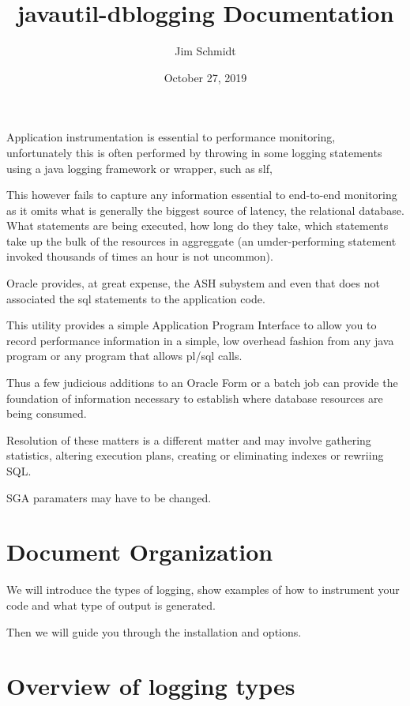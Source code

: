 \documentclass[letterpaper,10pt,english]{sphinxmanual}
\title{javautil-dblogging Documentation}
\date{October 27, 2019}
\author{Jim Schmidt}
\begin{document}
\maketitle
\tableofcontents
{}\label{index::doc}


Application instrumentation is essential to performance monitoring,
unfortunately this is often performed by throwing in some logging
statements using a java logging framework or wrapper, such as slf,

This however fails to capture any information essential to end-to-end
monitoring as it omits what is generally the biggest source of latency,
the relational database. What statements are being executed, how long do
they take, which statements take up the bulk of the resources in
aggreggate (an umder-performing statement invoked thousands of times an
hour is not uncommon).

Oracle provides, at great expense, the ASH subystem and even that does
not associated the sql statements to the application code.

This utility provides a simple Application Program Interface to allow
you to record performance information in a simple, low overhead fashion
from any java program or any program that allows pl/sql calls.

Thus a few judicious additions to an Oracle Form or a batch job can
provide the foundation of information necessary to establish where
database resources are being consumed.

Resolution of these matters is a different matter and may involve
gathering statistics, altering execution plans, creating or eliminating
indexes or rewriing SQL.

SGA paramaters may have to be changed.


\chapter{Document Organization}
\label{index:dblogging-2019-10-16}\label{index:document-organization}
We will introduce the types of logging, show examples of how to
instrument your code and what type of output is generated.

Then we will guide you through the installation and options.


\chapter{Overview of logging types}
\label{index:overview-of-logging-types}
\end{document}
